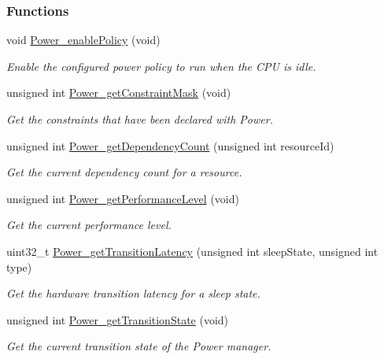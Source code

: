 \subsubsection*{Functions}
\begin{DoxyCompactItemize}
\item 
void \hyperlink{_power_8h_ae8d6092a8fb35b6db52a69a35fcc327f}{Power\+\_\+enable\+Policy} (void)
\begin{DoxyCompactList}\small\item\em Enable the configured power policy to run when the C\+P\+U is idle. \end{DoxyCompactList}\item 
unsigned int \hyperlink{_power_8h_ac5382aa1050fdf893b55d14041ca0b09}{Power\+\_\+get\+Constraint\+Mask} (void)
\begin{DoxyCompactList}\small\item\em Get the constraints that have been declared with Power. \end{DoxyCompactList}\item 
unsigned int \hyperlink{_power_8h_aee0ed212807eebbed776dbbde19b9567}{Power\+\_\+get\+Dependency\+Count} (unsigned int resource\+Id)
\begin{DoxyCompactList}\small\item\em Get the current dependency count for a resource. \end{DoxyCompactList}\item 
unsigned int \hyperlink{_power_8h_a992dabafbcd2ed75308dd3e166d9e658}{Power\+\_\+get\+Performance\+Level} (void)
\begin{DoxyCompactList}\small\item\em Get the current performance level. \end{DoxyCompactList}\item 
uint32\+\_\+t \hyperlink{_power_8h_a46c52f4c1e6801fdce3d5307257bf2a6}{Power\+\_\+get\+Transition\+Latency} (unsigned int sleep\+State, unsigned int type)
\begin{DoxyCompactList}\small\item\em Get the hardware transition latency for a sleep state. \end{DoxyCompactList}\item 
unsigned int \hyperlink{_power_8h_a6be3927156b139cf59cd4bec912f62f6}{Power\+\_\+get\+Transition\+State} (void)
\begin{DoxyCompactList}\small\item\em Get the current transition state of the Power manager. \end{DoxyCompactList}\item 

\end{DoxyCompactItemize}
